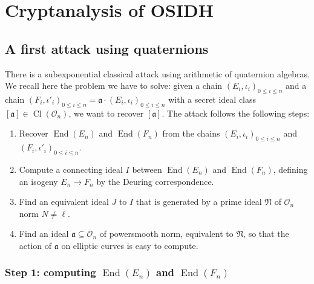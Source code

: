 \documentclass[a4paper,10pt]{report}
\theoremstyle{definition}
\theoremstyle{plain}
\theoremstyle{definition}
\newcommand{\mO}{\mathcal{O}}
\renewcommand{\(}{\left(}
\renewcommand{\)}{\right)}
\newcommand{\mf}[1]{\mathfrak{#1}}
\DeclareMathOperator{\End}{End}
\DeclareMathOperator{\Cl}{Cl}
\begin{document}
\chapter{Cryptanalysis of OSIDH}

\section{A first attack using quaternions}\label{paragraph 7}

There is a subexponential classical attack using arithmetic of quaternion algebras.  We recall here the problem we have to solve: given a chain $(E_i,\iota_i)_{0\leq i\leq n}$ and a chain $(F_i,\iota'_i)_{0\leq i\leq n}=\mf{a}\cdot(E_i,\iota_i)_{0\leq i\leq n}$ with a secret ideal class $[\mf{a}]\in\Cl(\mO_n)$, we want to recover $[\mf{a}]$. The attack follows the following steps:
\begin{enumerate}
\item Recover $\End(E_n)$ and $\End(F_n)$ from the chains $(E_i,\iota_i)_{0\leq i\leq n}$ and $(F_i,\iota'_i)_{0\leq i\leq n}$.
\item Compute a connecting ideal $I$ between $\End(E_n)$ and $\End(F_n)$, defining an isogeny $E_n\longrightarrow F_n$ by the Deuring correspondence.
\item Find an equivalent ideal $J$ to $I$ that is generated by a prime ideal $\mf{N}$ of $\mO_n$ norm $N\neq\ell$.
\item Find an ideal $\mf{a}\subseteq \mO_n$ of powersmooth norm, equivalent to $\mf{N}$, so that the action of $\mf{a}$ on elliptic curves is easy to compute.
\end{enumerate}

\subsection{Step 1: computing $\End(E_n)$ and $\End(F_n)$}\label{paragraph 6}
\end{document}
